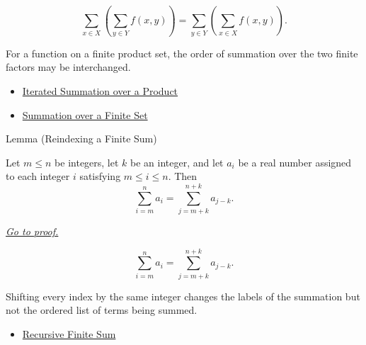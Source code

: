 \begin{remark*}
\[
  \sum_{x\in X}\left(\sum_{y\in Y} f(x,y)\right)
  =
  \sum_{y\in Y}\left(\sum_{x\in X} f(x,y)\right).
\]
\end{remark*}

\begin{remark*}[Interpretation]
For a function on a finite product set, the order of summation over the two
finite factors may be interchanged.
\end{remark*}

\begin{dependencies}
\begin{itemize}
  \item \hyperref[lem:iterated-summation-over-product]{Iterated Summation over a Product}
  \item \hyperref[def:summation-over-finite-set]{Summation over a Finite Set}
\end{itemize}
\end{dependencies}

\begin{lemmabox}{Lemma (Reindexing a Finite Sum)}
\begin{lemma}
\label{lem:finite-sum-reindexing}

Let \(m \le n\) be integers, let \(k\) be an integer, and let \(a_i\)
be a real number assigned to each integer \(i\) satisfying \(m \le i
\le n\). Then
\[
  \sum_{i=m}^{n} a_i
  =
  \sum_{j=m+k}^{n+k} a_{j-k}.
\]

\smallskip
\noindent
\hyperref[prf:finite-sum-reindexing]{\textit{Go to proof.}}
\end{lemma}
\end{lemmabox}

\begin{remark*}
\[
  \sum_{i=m}^{n}a_i
  =
  \sum_{j=m+k}^{n+k}a_{j-k}.
\]
\end{remark*}

\begin{remark*}[Interpretation]
Shifting every index by the same integer changes the labels of the
summation but not the ordered list of terms being summed.
\end{remark*}

\begin{dependencies}
\begin{itemize}
  \item \hyperref[def:recursive-finite-sum]{Recursive Finite Sum}
\end{itemize}
\end{dependencies}

